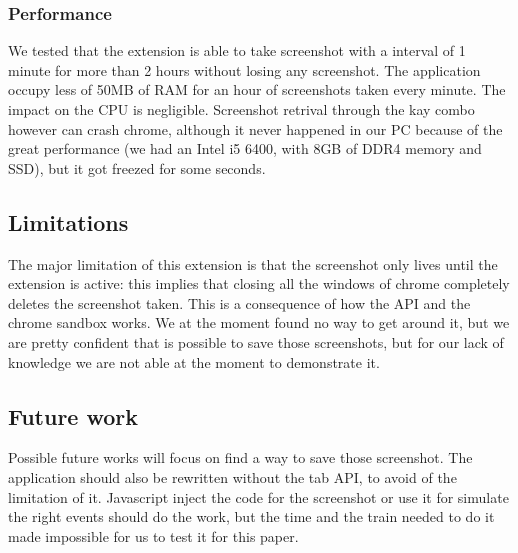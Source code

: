 \documentclass[12pt]{article}
\begin{document}
\begin{multicols}{2}
\subsubsection*{Performance}
We tested that the extension is able to take screenshot with a interval of 1 minute for more than 2 hours without losing any screenshot.
The application occupy less of 50MB of RAM for an hour of screenshots taken every minute. The impact on the CPU is negligible.
Screenshot retrival through the kay combo however can  crash chrome, although it never happened in our PC because of the great performance (we had an Intel i5 6400, with 8GB of DDR4 memory and SSD), but it got freezed for some seconds.
\subsection*{Limitations}
The major limitation of this extension is that the screenshot only lives until the extension is active: this implies that closing all the windows of chrome completely deletes the screenshot taken.
This is a consequence of how the API and the chrome sandbox works. We at the moment found no way to get around it, but we are pretty confident that is possible to save those screenshots, but for our lack of knowledge we are not able at the moment to demonstrate it.
\subsection*{Future work}
Possible future works will focus on find a way to save those screenshot.
The application should also be rewritten without the tab API, to avoid of the limitation of it.
Javascript inject the code for the screenshot or use it for simulate the right events should do the work, but the time and the train needed to do it made impossible for us to test it for this paper.

\end{multicols}
\end{document}
